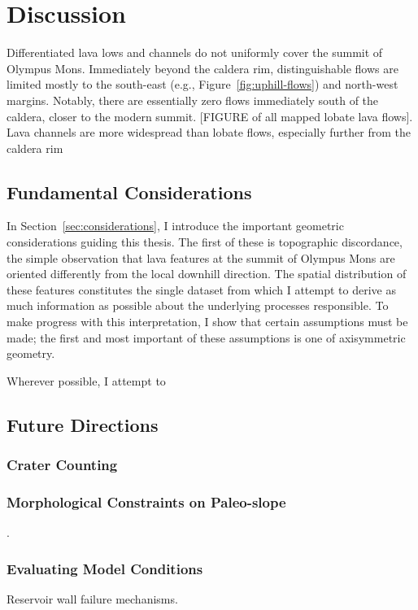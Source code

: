 \chapter{Discussion}

Differentiated lava lows and channels do not uniformly cover the summit of Olympus Mons. Immediately beyond the caldera rim, distinguishable flows are limited mostly to the south-east (e.g., Figure~\ref{fig:uphill-flows}) and north-west margins. Notably, there are essentially zero flows immediately south of the caldera, closer to the modern summit. [FIGURE of all mapped lobate lava flows]. Lava channels are more widespread than lobate flows, especially further from the caldera rim 

\section{Fundamental Considerations}

In Section~\ref{sec:considerations}, I introduce the important geometric considerations guiding this thesis. The first of these is topographic discordance, the simple observation that lava features at the summit of Olympus Mons are oriented differently from the local downhill direction. The spatial distribution of these features constitutes the single dataset from which I attempt to derive as much information as possible about the underlying processes responsible. To make progress with this interpretation, I show that certain assumptions must be made; the first and most important of these assumptions is one of axisymmetric geometry.

Wherever possible, I attempt to 

\section{Future Directions}

\subsection{Crater Counting}
\textcite{kneissl_map-projection-independent_2011,robbins_volcanic_2011,
robbins_large_2013,
platz_crater-based_2013}

\subsection{Morphological Constraints on Paleo-slope}
\textcite{wadge_lobes_1991, peitersen_correlations_2000, peters_lava_2021}.

\subsection{Evaluating Model Conditions}

Reservoir wall failure mechanisms.

